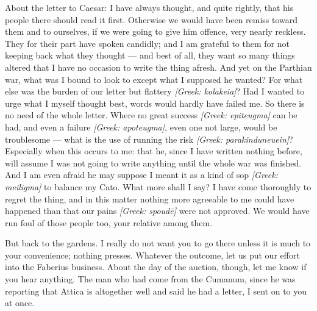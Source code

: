 

 About the letter to Caesar: I have always thought, and quite rightly, that his people there should read it first. Otherwise we would have been remiss toward them and to ourselves, if we were going to give him offence, very nearly reckless. They for their part have spoken candidly; and I am grateful to them for not keeping back what they thought --- and best of all, they want so many things altered that I have no occasion to write the thing afresh. And yet on the Parthian war, what was I bound to look to except what I supposed he wanted? For what else was the burden of our letter but flattery \textit{[Greek: kolakeia]}? Had I wanted to urge what I myself thought best, words would hardly have failed me. So there is no need of the whole letter. Where no great success \textit{[Greek: epiteugma]} can be had, and even a failure \textit{[Greek: apoteugma]}, even one not large, would be troublesome --- what is the use of running the risk \textit{[Greek: parakinduneuein]}? Especially when this occurs to me: that he, since I have written nothing before, will assume I was not going to write anything until the whole war was finished. And I am even afraid he may suppose I meant it as a kind of sop \textit{[Greek: meiligma]} to balance my Cato. What more shall I say? I have come thoroughly to regret the thing, and in this matter nothing more agreeable to me could have happened than that our pains \textit{[Greek: spoud\=e]} were not approved. We would have run foul of those people too, your relative among them.

 But back to the gardens. I really do not want you to go there unless it is much to your convenience; nothing presses. Whatever the outcome, let us put our effort into the Faberius business. About the day of the auction, though, let me know if you hear anything. The man who had come from the Cumanum, since he was reporting that Attica is altogether well and said he had a letter, I sent on to you at once.
